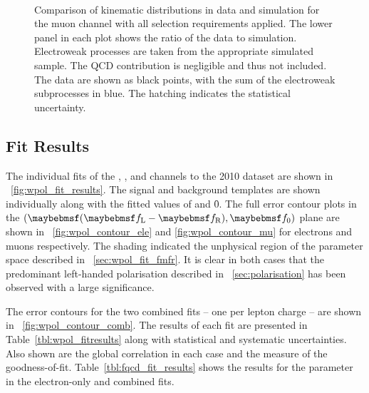 \begin{figure}[h!]
\centering
{}
\\
\caption{Comparison of kinematic distributions in data and simulation for the
  muon channel with all selection requirements applied. The lower panel in each
  plot shows the ratio of the data to simulation. Electroweak processes are
  taken from the appropriate simulated sample. The \ac{QCD} contribution is
  negligible and thus not included. The data are shown as black points, with the
  sum of the electroweak subprocesses in blue. The hatching indicates the
  statistical uncertainty.}
\label{fig:wpol_datamc_mu}
\end{figure}




\subsection{Fit Results}
The individual fits of the \Pep, \Pem, \Pgmp and \Pgmm channels to the 2010
dataset are shown in \fig~\ref{fig:wpol_fit_results}. The signal and
background templates are shown individually along with the fitted values of
\fLmfR and \f0. The full error contour plots in the $(\fLmfR, \f0)$ plane are
shown in \figs~\ref{fig:wpol_contour_ele} and \ref{fig:wpol_contour_mu} for
electrons and muons respectively. The shading indicated the unphysical region of
the parameter space described in \sec~\ref{sec:wpol_fit_fmfr}. It is clear in
both cases that the predominant left-handed polarisation described in
\sec~\ref{sec:polarisation} has been observed with a large significance.

The error contours for the two combined fits -- one per lepton charge -- are shown
in \fig~\ref{fig:wpol_contour_comb}. The results of each fit are presented in
Table~\ref{tbl:wpol_fitresults} along with statistical and systematic
uncertainties. Also shown are the global correlation in each case and the \chisq
measure of the goodness-of-fit. Table~\ref{tbl:fqcd_fit_results} shows the
results for the parameter \fQCD in the electron-only and combined fits.

